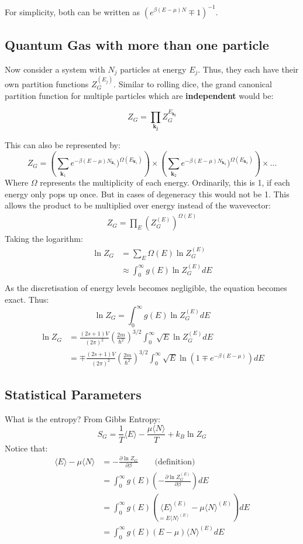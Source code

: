 \documentclass[12pt]{article}
\begin{document}
For simplicity, both can be written as \((e^{\beta(E-\mu)N}\mp1)^{-1}\).

\subsection{Quantum Gas with more than one particle}

Now consider a system with $N_j$ particles at energy $E_j$. Thus, they each have their own partition functions $Z^{(E_j)}_G$. Similar to rolling dice, the grand canonical partition function for multiple particles which are \textbf{independent} would be:

\[Z_G = \prod_{\mathbf{k_j}}Z_G^{E_\mathbf{k_j}}\]

This can also be represented by:
\[Z_G = \left(\sum_{\mathbf{k}_1}e^{-\beta(E-\mu)N_{\mathbf{k}_1}})^{\Omega(E_{\mathbf{k}_1})}\right)\times\left(\sum_{\mathbf{k}_2}e^{-\beta(E-\mu)N_{\mathbf{k}_2}})^{\Omega{(E_{\mathbf{k}_2})}}\right)\times...\]
Where $\Omega$ represents the multiplicity of each energy. Ordinarily, this is 1, if each energy only pops up once. But in cases of degeneracy this would not be 1. This allows the product to be multiplied over energy instead of the wavevector:
\begin{align*}
    Z_G = \prod_E\left(Z_G^{(E)}\right)^{\Omega(E)}
\end{align*}
Taking the logarithm:
\begin{align*}
    \ln Z_G &= \sum_E \Omega(E) \ln Z_G^{(E)}\\
    &\approx \int^\infty_0 g(E) \ln Z_G^{(E)} dE\\
\end{align*}
As the discretisation of energy levels becomes negligible, the equation becomes exact. Thus:
\[\boxed{\ln Z_G = \int^\infty_0 g(E) \ln Z_G^{(E)} dE}\]
\begin{align*}
    \ln Z_G &= \frac{(2s+1)V}{(2\pi)^2}\left(\frac{2m}{\hbar^2}\right)^{3/2}\int^\infty_0 \sqrt{E} \ln Z_G^{(E)} dE\\
    &=\mp\frac{(2s+1)V}{(2\pi)^2}\left(\frac{2m}{\hbar^2}\right)^{3/2}\int^\infty_0 \sqrt{E} \ln (1\mp e^{-\beta(E-\mu)}) dE
\end{align*}

\subsection{Statistical Parameters}
What is the entropy? From Gibbs Entropy:
\[S_G = \frac1T\langle E \rangle - \frac{\mu \langle N \rangle}{T} + k_B \ln Z_G \]
Notice that:
\begin{align*}
    \langle E \rangle - \mu \langle N \rangle &= -\frac{\partial \ln Z_G}{\partial \beta} \qquad \text{(definition)}\\
    &= \int^\infty_0 g(E) \left(-\frac{\partial \ln Z_G^{(E)}}{\partial \beta}\right) dE\\
    &= \int^\infty_0 g(E) \left( \underset{=E\langle N \rangle ^{(E)}}{\langle E\rangle ^{(E)}} - \mu \langle N \rangle ^{(E)} \right) dE\\
    &= \int^\infty_0 g(E) (E-\mu) \langle N \rangle ^{(E)}  dE
\end{align*}
\end{document}
